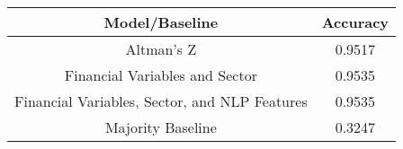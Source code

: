 \footnotesize
\begin{tabular}{cc}
\toprule
Model/Baseline & Accuracy \\
\midrule
Altman's Z & 0.9517 \\
Financial Variables and Sector & 0.9535 \\
Financial Variables, Sector, and NLP Features & 0.9535 \\
Majority Baseline & 0.3247 \\
\bottomrule
\end{tabular}

\normalsize